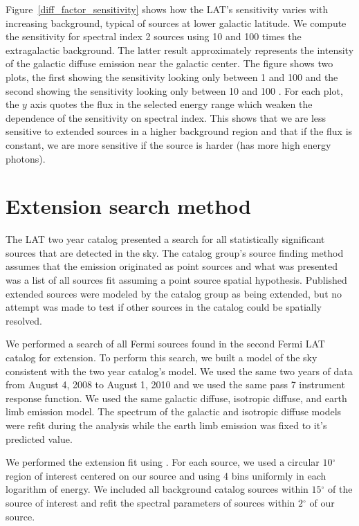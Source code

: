 \documentclass[12pt,preprint]{aastex}
\newcommand{\gev}{\text{GeV}\xspace}
\renewcommand{\deg}{\ensuremath{^\circ}\xspace}
\newcommand{\pointlike}{\text{\em pointlike}\xspace}
\begin{document}
Figure~\ref{diff_factor_sensitivity} shows how the LAT's
sensitivity varies with increasing background, typical of sources
at lower galactic latitude. We compute the sensitivity for spectral
index 2 sources using 10 and 100 times the
extragalactic background. The latter result approximately represents the intensity of
the galactic diffuse emission near the galactic center. 
The figure shows two plots, the first showing the sensitivity looking only between 
1 \gev and 100 \gev and the second showing the sensitivity looking only
between 10 \gev and 100 \gev.
For each plot, the $y$ axis quotes the flux in the selected energy range
which weaken the dependence of the sensitivity on spectral index.
This shows that we are less sensitive to extended sources in
a higher background region and that if the flux is constant,
we are more sensitive if the source is harder (has more high energy
photons).

\section{Extension search method}

The LAT two year catalog presented a search for all
statistically significant sources that are detected in the \gev
sky\cite{second_cat}.  The catalog group's source finding method assumes
that the emission originated as point sources and what was presented was
a list of all sources fit assuming a point source spatial hypothesis. 
Published extended sources were modeled by the catalog group as 
being extended, but no attempt was made to test if other sources in the catalog
could be spatially resolved.

We performed a search of all Fermi sources found in the second Fermi LAT
catalog for extension.  To perform this search, we built a model of the
sky consistent with the two year catalog's model.   We used the same two
years of data from August 4, 2008 to August 1, 2010 and we used the same
pass 7 instrument response function.  We used the same galactic diffuse,
isotropic diffuse, and earth limb emission model. The spectrum of the
galactic and isotropic diffuse models were refit during the analysis
while the earth limb emission was fixed to it's predicted value.

We performed the extension fit using \pointlike.  For each source, we
used a circular $10\deg$ region of interest centered on our source and
using 4 bins uniformly in each logarithm of energy.  We included all
background catalog sources within $15\deg$ of the source of interest
and refit the spectral parameters of sources within $2\deg$ of our source.
\end{document}
